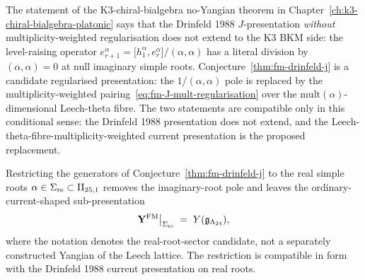 \begin{remark}
\label{rem:fm-J-scope-reconciliation}
The statement of the K3-chiral-bialgebra no-Yangian theorem in Chapter~\ref{ch:k3-chiral-bialgebra-platonic} says that the Drinfeld 1988 $J$-presentation \emph{without} multiplicity-weighted regularisation does not extend to the K3 BKM side: the level-raising operator $e^\alpha_{r+1} = \bigl[h^\alpha_1, e^\alpha_r\bigr]/(\alpha, \alpha)$ has a literal division by $(\alpha, \alpha) = 0$ at null imaginary simple roots. Conjecture~\ref{thm:fm-drinfeld-j} is a candidate regularised presentation: the $1/(\alpha, \alpha)$ pole is replaced by the multiplicity-weighted pairing~\eqref{eq:fm-J-mult-regularisation} over the $\mathrm{mult}(\alpha)$-dimensional Leech-theta fibre. The two statements are compatible only in this conditional sense: the Drinfeld 1988 presentation does not extend, and the Leech-theta-fibre-multiplicity-weighted current presentation is the proposed replacement.
\end{remark}

\begin{proposition}
\label{ver:fm-J-path-iv}
Restricting the generators of Conjecture~\ref{thm:fm-drinfeld-j} to the real simple roots $\alpha \in \Sigma_{\mathrm{re}} \subset \mathrm{II}_{25,1}$ removes the imaginary-root pole and leaves the ordinary-current-shaped sub-presentation
\[
 \mathbf{Y}^{\mathrm{FM}}\big|_{\Sigma_{\mathrm{re}}} \;=\; Y(\mathfrak{g}_{\Lambda_{24}}),
\]
where the notation denotes the real-root-sector candidate, not a
separately constructed Yangian of the Leech lattice. The restriction is
compatible in form with the Drinfeld 1988 current presentation on real
roots.
\end{proposition}

